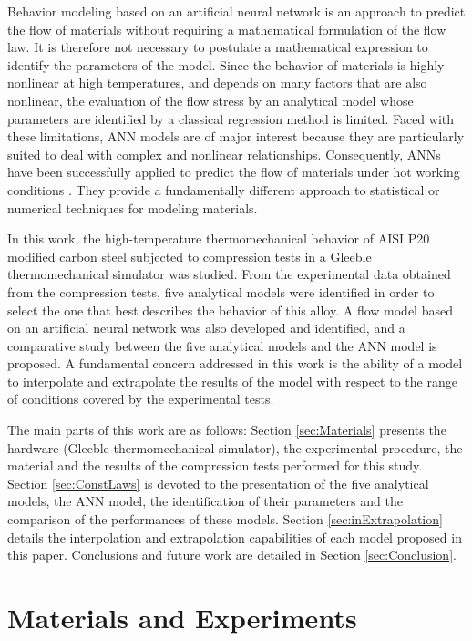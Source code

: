 \documentclass[twoside,english,1p,final,sort&compress]{elsarticle}
\theoremstyle{plain}
\begin{document}
Behavior modeling based on an artificial neural network is an approach to predict the flow of materials without requiring a mathematical formulation of the flow law.
It is therefore not necessary to postulate a mathematical expression to identify the parameters of the model.
Since the behavior of materials is highly nonlinear at high temperatures, and depends on many factors that are also nonlinear, the evaluation of the flow stress by an analytical model whose parameters are identified by a classical regression method is limited.
Faced with these limitations, ANN models are of major interest because they are particularly suited to deal with complex and nonlinear relationships.
Consequently, ANNs have been successfully applied to predict the flow of materials under hot working conditions \cite{Lin-2008-ANN, Lu-2011-ANN, Ashtiani-2016-CSP, Stoffel-2019-NNB, Pantale-2021}.
They provide a fundamentally different approach to statistical or numerical techniques for modeling materials.

In this work, the high-temperature thermomechanical behavior of AISI P20 modified carbon steel subjected to compression tests in a Gleeble thermomechanical simulator was studied.
From the experimental data obtained from the compression tests, five analytical models were identified in order to select the one that best describes the behavior of this alloy.
A flow model based on an artificial neural network was also developed and identified, and a comparative study between the five analytical models and the ANN model is proposed.
A fundamental concern addressed in this work is the ability of a model to interpolate and extrapolate the results of the model with respect to the range of conditions covered by the experimental tests.

The main parts of this work are as follows: Section \ref{sec:Materials} presents the hardware (Gleeble thermomechanical simulator), the experimental procedure, the material and the results of the compression tests performed for this study.
Section \ref{sec:ConstLaws} is devoted to the presentation of the five analytical models, the ANN model, the identification of their parameters and the comparison of the performances of these models.
Section \ref{sec:inExtrapolation} details the interpolation and extrapolation capabilities of each model proposed in this paper.
Conclusions and future work are detailed in Section \ref{sec:Conclusion}.

\section{Materials and Experiments\label{sec:Materials}}
\end{document}
